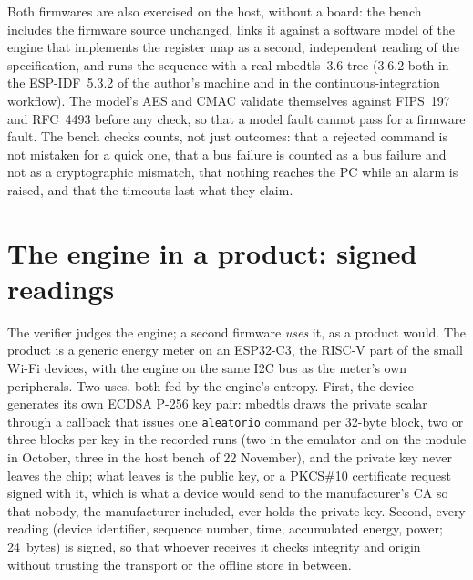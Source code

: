 Both firmwares are also exercised on the host, without a board: the
bench includes the firmware source unchanged, links it against a software
model of the engine that implements the register map as a second,
independent reading of the specification, and runs the sequence with a
real mbedtls~3.6 tree (3.6.2 both in the ESP-IDF~5.3.2 of the author's
machine and in the continuous-integration workflow). The model's AES and
CMAC
validate themselves against FIPS~197 and RFC~4493 before any check, so
that a model fault cannot pass for a firmware fault. The bench checks
counts, not just outcomes: that a rejected command is not mistaken for a
quick one, that a bus failure is counted as a bus failure and not as a
cryptographic mismatch, that nothing reaches the PC while an alarm is
raised, and that the timeouts last what they claim.

\section{The engine in a product: signed readings}
\label{sec:lecturas_firmadas}

The verifier judges the engine; a second firmware \emph{uses} it, as a
product would. The product is a generic energy meter on an ESP32-C3, the
RISC-V part of the small Wi-Fi devices, with the engine on the same
\ac{I2C} bus as the meter's own peripherals. Two uses, both fed by the
engine's entropy. First, the device generates its own ECDSA P-256 key
pair: mbedtls draws the private scalar through a callback that issues
one \texttt{aleatorio} command per 32-byte block, two or three blocks
per key in the recorded runs (two in the emulator and on the module in
October, three in the host bench of 22 November), and the private key never leaves the chip; what leaves is the public key, or
a PKCS\#10 certificate request signed with it, which is what a device
would send to the manufacturer's CA so that nobody, the manufacturer
included, ever holds the private key. Second, every reading (device
identifier, sequence number, time, accumulated energy, power; 24~bytes)
is signed, so that whoever receives it checks integrity and origin
without trusting the transport or the offline store in between.

